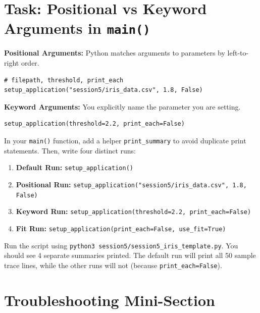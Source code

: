 \section{Task: Positional vs Keyword Arguments in \texttt{main()}}

\textbf{Positional Arguments:} Python matches arguments to parameters by left-to-right order.
\begin{verbatim}
# filepath, threshold, print_each
setup_application("session5/iris_data.csv", 1.8, False)
\end{verbatim}

\textbf{Keyword Arguments:} You explicitly name the parameter you are setting.
\begin{verbatim}
setup_application(threshold=2.2, print_each=False)
\end{verbatim}

\begin{tcolorbox}[title=Do: Write main() with Four Runs]
In your \texttt{main()} function, add a helper \texttt{print\_summary} to avoid duplicate print statements. Then, write four distinct runs:
\begin{enumerate}
    \item \textbf{Default Run:} \texttt{setup\_application()}
    \item \textbf{Positional Run:} \texttt{setup\_application("session5/iris\_data.csv", 1.8, False)}
    \item \textbf{Keyword Run:} \texttt{setup\_application(threshold=2.2, print\_each=False)}
    \item \textbf{Fit Run:} \texttt{setup\_application(print\_each=False, use\_fit=True)}
\end{enumerate}
\end{tcolorbox}

\begin{tcolorbox}[title=Checkpoint]
Run the script using \texttt{python3 session5/session5\_iris\_template.py}.
You should see 4 separate summaries printed. The default run will print all 50 sample trace lines, while the other runs will not (because \texttt{print\_each=False}). 
\end{tcolorbox}

\section{Troubleshooting Mini-Section}

